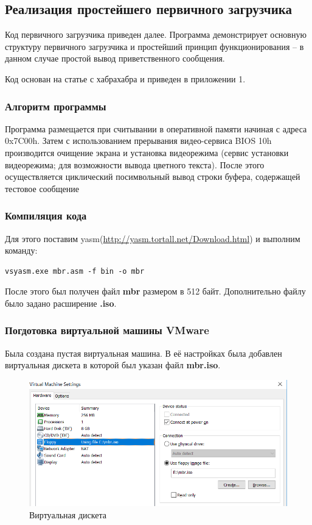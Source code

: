 \subsection{Реализация простейшего первичного загрузчика}
Код первичного загрузчика приведен далее. Программа демонстрирует основную структуру первичного загрузчика и простейший принцип функционирования – в данном случае простой вывод приветственного сообщения.

Код основан на статье с хабрахабра\cite{mbrGuide} и приведен в приложении 1.
\subsubsection{Алгоритм программы}
Программа размещается при считывании в оперативной памяти начиная  с адреса 0x7C00h. Затем с использованием прерывания видео-сервиса BIOS 10h производится очищение экрана и установка видеорежима (сервис установки видеорежима; для возможности вывода цветного текста). После этого осуществляется циклический посимвольный вывод строки буфера, содержащей тестовое сообщение 
\subsubsection{Компиляция кода}
Для этого поставим yasm(\url{http://yasm.tortall.net/Download.html}) и выполним команду:
\begin{lstlisting}[language={}, caption={Компиляция ассемблерного кода}]
vsyasm.exe mbr.asm -f bin -o mbr
\end{lstlisting}
После этого был получен файл \textbf{mbr} размером в 512 байт. Дополнительно файлу было задано расширение \textbf{.iso}.
\subsubsection{Погдотовка виртуальной машины VMware}
Была создана пустая виртуальная машина. В её настройках была добавлен виртуальная дискета в которой был указан файл \textbf{mbr.iso}.
\begin{figure}[H]
  \centering
  \includegraphics[width=.8\textwidth]{img/p1/4}
  \caption{Виртуальная дискета}
\end{figure}
